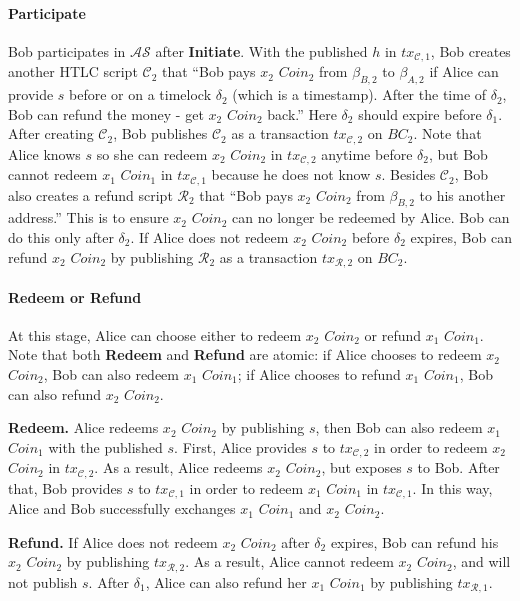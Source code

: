 \paragraph{\textbf{Participate}}
Bob participates in $\mathcal{AS}$ after \textbf{Initiate}.
With the published $h$ in $tx_{\mathcal{C}, 1}$, Bob creates another HTLC script $\mathcal{C}_2$ that ``Bob pays $x_2$ $Coin_2$ from $\beta_{B, 2}$ to $\beta_{A, 2}$ if Alice can provide $s$ before or on a timelock $\delta_2$ (which is a timestamp). After the time of $\delta_2$, Bob can refund the money - get $x_2$ $Coin_2$ back.''
Here $\delta_2$ should expire before $\delta_1$.
After creating $\mathcal{C}_2$, Bob publishes $\mathcal{C}_2$ as a transaction $tx_{\mathcal{C}, 2}$ on $BC_2$.
Note that Alice knows $s$ so she can redeem $x_2$ $Coin_2$ in $tx_{\mathcal{C}, 2}$ anytime before $\delta_2$,
but Bob cannot redeem $x_1$ $Coin_1$ in $tx_{\mathcal{C}, 1}$ because he does not know $s$.
Besides $\mathcal{C}_2$, Bob also creates a refund script $\mathcal{R}_2$ that ``Bob pays $x_2$ $Coin_2$ from $\beta_{B, 2}$ to his another address.''
This is to ensure $x_2$ $Coin_2$ can no longer be redeemed by Alice. Bob can do this only after $\delta_2$.
If Alice does not redeem $x_2$ $Coin_2$ before $\delta_2$ expires, Bob can refund $x_2$ $Coin_2$ by publishing $\mathcal{R}_2$ as a transaction $tx_{\mathcal{R}, 2}$ on $BC_2$.

\paragraph{\textbf{Redeem} or \textbf{Refund}}
At this stage, Alice can choose either to redeem $x_2$ $Coin_2$ or refund $x_1$ $Coin_1$.
Note that both \textbf{Redeem} and \textbf{Refund} are atomic:
if Alice chooses to redeem $x_2$ $Coin_2$, Bob can also redeem $x_1$ $Coin_1$;
if Alice chooses to refund $x_1$ $Coin_1$, Bob can also refund $x_2$ $Coin_2$.

\textbf{Redeem.}
Alice redeems $x_2$ $Coin_2$ by publishing $s$, then Bob can also redeem $x_1$ $Coin_1$ with the published $s$.
First, Alice provides $s$ to $tx_{\mathcal{C}, 2}$ in order to redeem $x_2$ $Coin_2$ in $tx_{\mathcal{C}, 2}$.
As a result, Alice redeems $x_2$ $Coin_2$, but exposes $s$ to Bob.
After that, Bob provides $s$ to $tx_{\mathcal{C}, 1}$ in order to redeem $x_1$ $Coin_1$ in $tx_{\mathcal{C}, 1}$.
In this way, Alice and Bob successfully exchanges $x_1$ $Coin_1$ and $x_2$ $Coin_2$.

\textbf{Refund.}
If Alice does not redeem $x_2$ $Coin_2$ after $\delta_2$ expires, Bob can refund his $x_2$ $Coin_2$ by publishing $tx_{\mathcal{R}, 2}$.
As a result, Alice cannot redeem $x_2$ $Coin_2$, and will not publish $s$.
After $\delta_1$, Alice can also refund her $x_1$ $Coin_1$ by publishing $tx_{\mathcal{R}, 1}$.


